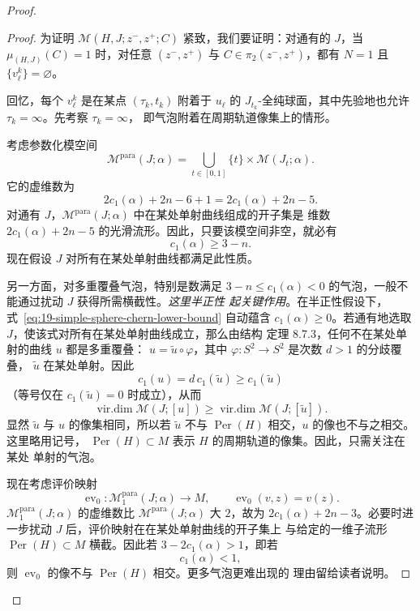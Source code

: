 \begin{proof}
\begin{proof}
为证明 $\mathcal M(H,J;z^-,z^+;C)$ 紧致，我们要证明：对通有的 $J$，当
$\mu_{(H,J)}(C)=1$ 时，对任意 $(z^-,z^+)$ 与
$C\in\pi_2(z^-,z^+)$，都有 $N=1$ 且 $\{v_\ell^k\}=\varnothing$。

回忆，每个 $v_\ell^k$ 是在某点 $(\tau_k,t_k)$ 附着于 $u_\ell$ 的
$J_{t_k}$-全纯球面，其中先验地也允许 $\tau_k=\infty$。先考察 $\tau_k=\infty$，
即气泡附着在周期轨道像集上的情形。

考虑参数化模空间
\[
 \mathcal M^{\mathrm{para}}(J;\alpha)
 =\bigcup_{t\in[0,1]}\{t\}\times\mathcal M(J_t;\alpha).
\]
它的虚维数为
\[
 2c_1(\alpha)+2n-6+1=2c_1(\alpha)+2n-5.
\]
对通有 $J$，$\mathcal M^{\mathrm{para}}(J;\alpha)$ 中在某处单射曲线组成的开子集是
维数 $2c_1(\alpha)+2n-5$ 的光滑流形。因此，只要该模空间非空，就必有
\begin{equation}
 c_1(\alpha)\geq3-n.
\label{eq:19-simple-sphere-chern-lower-bound}
\end{equation}
现在假设 $J$ 对所有在某处单射曲线都满足此性质。

另一方面，对多重覆叠气泡，特别是\personChern{}数满足
$3-n\leq c_1(\alpha)<0$ 的气泡，一般不能通过扰动 $J$ 获得所需横截性。\emph{这里半正性
起关键作用}。在半正性假设下，式~\eqref{eq:19-simple-sphere-chern-lower-bound} 自动蕴含
$c_1(\alpha)\geq0$。若通有地选取 $J$，使该式对所有在某处单射曲线成立，那么由结构
定理 8.7.3，任何不在某处单射的曲线 $u$ 都是多重覆叠：
$u=\widetilde u\circ\varphi$，其中 $\varphi:S^2\to S^2$ 是次数 $d>1$ 的分歧覆叠，
$\widetilde u$ 在某处单射。因此
\[
 c_1(u)=d\,c_1(\widetilde u)\geq c_1(\widetilde u)
\]
（等号仅在 $c_1(\widetilde u)=0$ 时成立），从而
\[
 \operatorname{vir.dim}\mathcal M(J;[u])
 \geq\operatorname{vir.dim}\mathcal M(J;[\widetilde u]).
\]
显然 $\widetilde u$ 与 $u$ 的像集相同，所以若 $\widetilde u$ 不与
$\operatorname{Per}(H)$ 相交，$u$ 的像也不与之相交。这里略用记号，
$\operatorname{Per}(H)\subset M$ 表示 $H$ 的周期轨道的像集。因此，只需关注在某处
单射的气泡。

现在考虑评价映射
\[
 \operatorname{ev}_0:\mathcal M_1^{\mathrm{para}}(J;\alpha)
 \longrightarrow M,\qquad \operatorname{ev}_0(v,z)=v(z).
\]
$\mathcal M_1^{\mathrm{para}}(J;\alpha)$ 的虚维数比
$\mathcal M^{\mathrm{para}}(J;\alpha)$ 大 $2$，故为
$2c_1(\alpha)+2n-3$。必要时进一步扰动 $J$ 后，评价映射在在某处单射曲线的开子集上
与给定的一维子流形 $\operatorname{Per}(H)\subset M$ 横截。因此若
$3-2c_1(\alpha)>1$，即若
\begin{equation}
 c_1(\alpha)<1,
\label{eq:19-evaluation-avoids-periodic-orbits}
\end{equation}
则 $\operatorname{ev}_0$ 的像不与 $\operatorname{Per}(H)$ 相交。更多气泡更难出现的
理由留给读者说明。


\end{proof}
\end{proof}
